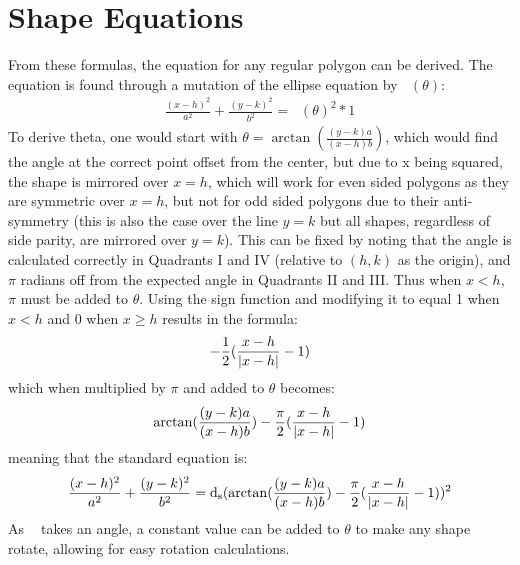 \documentclass[11pt]{article}
\DeclareMathOperator{\custd}{\mathrm{d}_s}
\DeclareMathOperator{\custdsq}{\mathrm{d}_s}
\DeclarePairedDelimiter\abs{\lvert}{\rvert}%
\begin{document}
\section{Shape Equations}
From these formulas, the equation for any regular polygon can be derived. The equation is found through a mutation of the ellipse equation by \(\custd(\theta)\):
\begin{gather*}
\frac{(x-h)^2}{a^2}+\frac{(y-k)^2}{b^2}=\custd(\theta)^2*1
\end{gather*}
To derive theta, one would start with \(\theta=\arctan(\frac{(y-k)a}{(x-h)b})\), which would find the angle at the correct point offset from the center, but due to x being squared, the shape is mirrored over \(x=h\), which will work for even sided polygons as they are symmetric over \(x=h\), but not for odd sided polygons due to their anti-symmetry (this is also the case over the line \(y=k\) but all shapes, regardless of side parity, are mirrored over \(y=k\)). This can be fixed by noting that the angle is calculated correctly in Quadrants I and IV (relative to \((h,k)\) as the origin), and \(\pi\) radians off from the expected angle in Quadrants II and III. Thus when \(x<h\), \(\pi\) must be added to \(\theta\). Using the sign function and modifying it to equal 1 when \(x<h\) and 0 when \(x\geq h\) results in the formula:
\begin{gather*}
-\frac{1}{2}(\frac{x-h}{\abs{x-h}}-1)
\end{gather*}
which when multiplied by \(\pi\) and added to \(\theta\) becomes:
\begin{gather*}
\arctan(\frac{(y-k)a}{(x-h)b})-\frac{\pi}{2}(\frac{x-h}{\abs{x-h}}-1)
\end{gather*}
meaning that the standard equation is:
\begin{gather*}
\frac{(x-h)^2}{a^2}+\frac{(y-k)^2}{b^2}=\custdsq(\arctan(\frac{(y-k)a}{(x-h)b})-\frac{\pi}{2}(\frac{x-h}{\abs{x-h}}-1))^2
\end{gather*}
As \(\custd\) takes an angle, a constant value can be added to \(\theta\) to make any shape rotate, allowing for easy rotation calculations.
\end{document}
